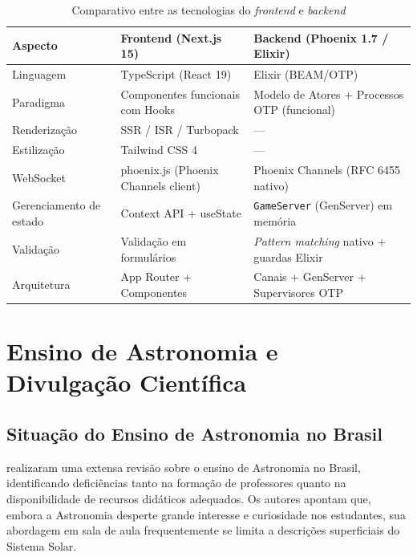 \documentclass[
	12pt,
	openany,
	oneside,
	a4paper,
	english,
	brazil
]{abntex2}
\begin{document}
\begin{table}[htb]
\caption{\label{tab:comparativo}Comparativo entre as tecnologias do \textit{frontend} e \textit{backend}}
\begin{tabular}{p{3.5cm}|p{5.5cm}|p{5.5cm}}
  \toprule
  \textbf{Aspecto} & \textbf{Frontend (Next.js 15)} & \textbf{Backend (Phoenix 1.7 / Elixir)} \\
  \midrule
  Linguagem & TypeScript (React 19) & Elixir (BEAM/OTP) \\
  \midrule
  Paradigma & Componentes funcionais com Hooks & Modelo de Atores + Processos OTP (funcional) \\
  \midrule
  Renderização & SSR / ISR / Turbopack & --- \\
  \midrule
  Estilização & Tailwind CSS 4 & --- \\
  \midrule
  WebSocket & phoenix.js (Phoenix Channels client) & Phoenix Channels (RFC 6455 nativo) \\
  \midrule
  Gerenciamento de estado & Context API + useState & \texttt{GameServer} (GenServer) em memória \\
  \midrule
  Validação & Validação em formulários & \textit{Pattern matching} nativo + guardas Elixir \\
  \midrule
  Arquitetura & App Router + Componentes & Canais + GenServer + Supervisores OTP \\
  \bottomrule
\end{tabular}
\end{table}

\section{Ensino de Astronomia e Divulgação Científica}\label{sec:astronomia}

\subsection{Situação do Ensino de Astronomia no Brasil}

 realizaram uma extensa revisão sobre o ensino de Astronomia no Brasil, identificando deficiências tanto na formação de professores quanto na disponibilidade de recursos didáticos adequados. Os autores apontam que, embora a Astronomia desperte grande interesse e curiosidade nos estudantes, sua abordagem em sala de aula frequentemente se limita a descrições superficiais do Sistema Solar.
\end{document}
